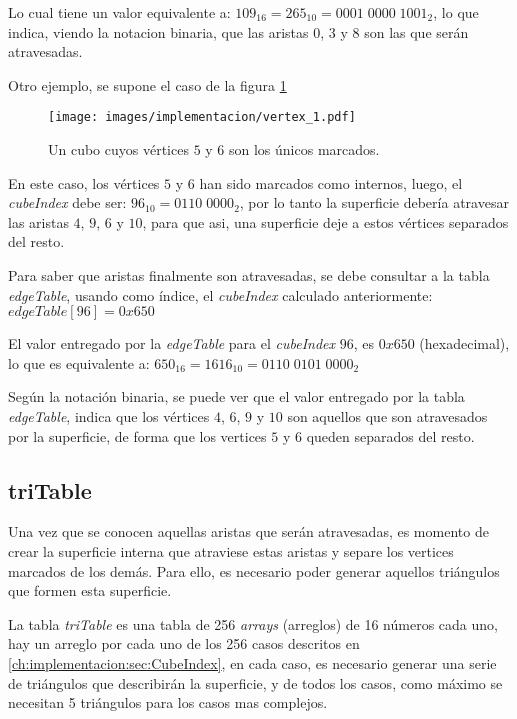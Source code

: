 Lo cual tiene un valor equivalente a: $109_{16} = 265_{10} = 0001 \; 0000 \; 1001_{2}$, lo que indica, viendo la notacion binaria, que las aristas $0$, $3$ y $8$ son las que serán atravesadas.

Otro ejemplo, se supone el caso de la figura \ref{f:ch:implementacion:sec:CubeIndex:edgeTable:example}

\begin{figure}[hbt]
	\centering
	\fbox
	{
		\texttt{[image: images/implementacion/vertex\_1.pdf]}
	}
	\caption{Un cubo cuyos vértices $5$ y $6$ son los únicos marcados.}
	\label{f:ch:implementacion:sec:CubeIndex:edgeTable:example}
\end{figure}

En este caso, los vértices $5$ y $6$ han sido marcados como internos, luego, el \emph{cubeIndex} debe ser: $96_{10} = 0110 \; 0000_{2}$, por lo tanto la superficie debería atravesar las aristas $4$, $9$, $6$ y $10$, para que asi, una superficie deje a estos vértices separados del resto.

Para saber que aristas finalmente son atravesadas, se debe consultar a la tabla \emph{edgeTable}, usando como índice, el \emph{cubeIndex} calculado anteriormente: $edgeTable[96] = 0x650$

El valor entregado por la \emph{edgeTable} para el \emph{cubeIndex} $96$, es $0x650$ (hexadecimal), lo que es equivalente a: $650_{16} = 1616_{10} = 0110 \; 0101 \; 0000_{2}$

Según la notación binaria, se puede ver que el valor entregado por la tabla \emph{edgeTable}, indica que los vértices $4$, $6$, $9$ y $10$ son aquellos que son atravesados por la superficie, de forma que los vertices $5$ y $6$ queden separados del resto.

\subsection{triTable}
\label{ch:implementacion:sec:triTable}

Una vez que se conocen aquellas aristas que serán atravesadas, es momento de crear la superficie interna que atraviese estas aristas y separe los vertices marcados de los demás. Para ello, es necesario poder generar aquellos triángulos que formen esta superficie.

La tabla \emph{triTable} es una tabla de 256 \emph{arrays} (arreglos) de 16 números cada uno, hay un arreglo por cada uno de los 256 casos descritos en \ref{ch:implementacion:sec:CubeIndex}, en cada caso, es necesario generar una serie de triángulos que describirán la superficie, y de todos los casos, como máximo se necesitan 5 triángulos para los casos mas complejos.

